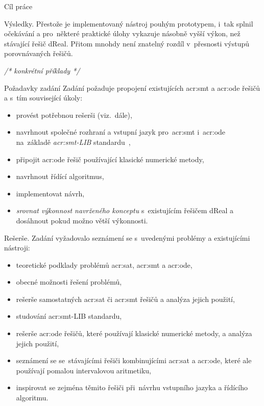 \documentclass[thesis=M,czech]{FITthesis}[2012/06/26]
\newcommand{\acrlabel}[1]{acr:#1}
\newcommand{\acr}[1]{\acrshort{\acrlabel{#1}}}
\newcommand{\cmt}[1]{\textit{/* #1 */}}
\newcommand{\hl}[1]{\textit{#1}}
\newcommand{\name}[1]{\hl{#1}}
\newcommand{\cit}[1]{\cite{#1}}
\begin{document}
\begin{introduction}
\begin{section}{Cíl práce}

\begin{paragraph}{Výsledky.}\label{p:intro:goal:results}
Přestože je implementovaný nástroj pouhým prototypem,
i~tak splnil očekávání
a pro~některé praktické úlohy
vykazuje násobně vyšší výkon,
než stávající řešič dReal.
Přitom mnohdy není znatelný rozdíl
v~přesnosti výstupů porovnávaných řešičů.

\cmt{konkrétní příklady}
\end{paragraph} %


\end{section} %


\begin{section}{Požadavky zadání}\label{s:intro:req}
Zadání požaduje propojení existujících \acr{smt} a \acr{ode} řešičů
a s~tím související úkoly:
\begin{itemize}
\item provést potřebnou rešerši (viz.~dále),
\item navrhnout společné rozhraní
   a vstupní jazyk pro~\acr{smt} i~\acr{ode}
   na~základě \name{\acr{smt}-LIB} standardu~\cit{smtlib},
\item připojit \acr{ode} řešič používající klasické numerické metody,
\item navrhnout řídící algoritmus,
\item implementovat návrh,
\item \hl{srovnat výkonnost navrženého konceptu}
   s~existujícím řešičem dReal a dosáhnout pokud možno větší výkonnosti.
\end{itemize}


\begin{paragraph}{Rešerše.}\label{p:intro:req:search}
Zadání vyžadovalo seznámení se
s~uvedenými problémy a existujícími nástroji:
\begin{itemize}
\item teoretické podklady problémů \acr{sat}, \acr{smt} a \acr{ode},
\item obecné možnosti řešení problémů,
\item rešerše samostatných \acr{sat} či \acr{smt} řešičů
   a analýza jejich použití,
\item studování \acr{smt}-LIB standardu,
\item rešerše \acr{ode} řešičů, které používají klasické numerické metody,
   a analýza jejich použití,
\item seznámení se se~stávajícími řešiči kombinujícími
   \acr{sat} a \acr{ode},
   které ale používají pomalou intervalovou aritmetiku,
\item inspirovat se zejména těmito řešiči
   při~návrhu vstupního jazyka a řídícího algoritmu.
\end{itemize}
\end{paragraph} %


\end{section}
\end{introduction}
\end{document}
